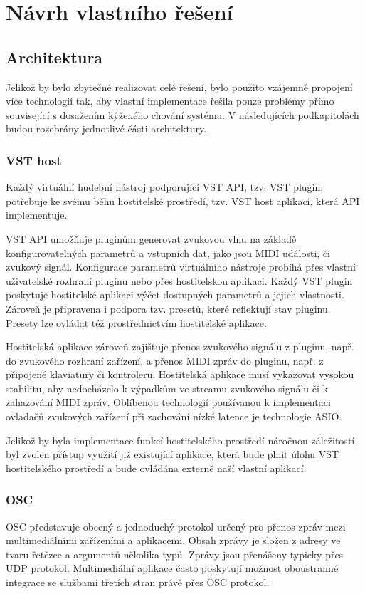 \documentclass[thesis=M,czech]{FITthesis}[2019/03/06]
\begin{document}
	\chapter{Návrh vlastního řešení}
	\section{Architektura}
	Jelikož by bylo zbytečné realizovat celé řešení, bylo použito vzájemné propojení více technologií tak,
	aby vlastní implementace řešila pouze problémy přímo související s dosažením kýženého chování systému. V následujících podkapitolách
	budou rozebrány jednotlivé části architektury.
	
	\subsection{VST host}
	Každý virtuální hudební nástroj podporující VST API, tzv. VST plugin, potřebuje ke svému běhu hostitelské prostředí, tzv. VST host aplikaci, která API implementuje\cite{vstdoc}.
	
	VST API umožňuje pluginům generovat zvukovou vlnu na základě konfigurovatelných
	parametrů a vstupních dat, jako jsou MIDI události, či zvukový signál.
	Konfigurace parametrů virtuálního nástroje probíhá přes vlastní uživatelské rozhraní pluginu nebo přes hostitelskou aplikaci.
	Každý VST plugin poskytuje hostitelské aplikaci výčet dostupných parametrů a jejich vlastnosti.
	Zároveň je připravena i podpora tzv. presetů, které reflektují stav pluginu. Presety lze ovládat též prostřednictvím
	hostitelské aplikace.
	
	Hostitelská aplikace zároveň zajišťuje přenos zvukového signálu z pluginu, např. do zvukového rozhraní zařízení,
	a přenos MIDI zpráv do pluginu, např. z připojené klaviatury či kontroleru. Hostitelská aplikace musí vykazovat
	vysokou stabilitu, aby nedocházelo k výpadkům ve streamu zvukového signálu či k zahazování MIDI zpráv. Oblíbenou 
	technologií používanou k implementaci ovladačů zvukových zařízení při zachování nízké latence je technologie ASIO\cite{asio}.
	
	Jelikož by byla implementace funkcí hostitelského prostředí náročnou záležitostí, byl zvolen přístup využití
	již existující aplikace, která bude plnit úlohu VST hostitelského prostředí a bude ovládána externě naší vlastní aplikací.
	
	\subsection{OSC}		
	OSC představuje obecný a jednoduchý protokol určený pro přenos zpráv mezi multimediálními zařízeními a aplikacemi\cite{osc}.
	Obsah zprávy je složen z adresy ve tvaru řetězce a argumentů několika typů.
	Zprávy jsou přenášeny typicky přes UDP protokol. Multimediální aplikace často poskytují možnost oboustranné integrace
	se službami třetích stran právě přes OSC protokol.
	
\end{document}
